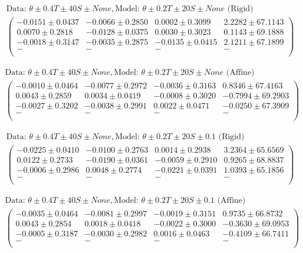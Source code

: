 \begin{align*}
\text{Data: }\theta\pm0.4 T\pm40 S\pm None, \text{Model: }\theta\pm0.2 T\pm20 S\pm None \text{ (Rigid)} \\
\begin{pmatrix}
-0.0151 \pm 0.0437 & -0.0066 \pm 0.2850 &  0.0002 \pm 0.3099 &  2.2282 \pm 67.1143 \\
 0.0070 \pm 0.2818 & -0.0128 \pm 0.0375 &  0.0030 \pm 0.3023 &  0.1143 \pm 69.1888 \\
-0.0018 \pm 0.3147 & -0.0035 \pm 0.2875 & -0.0135 \pm 0.0415 &  2.1211 \pm 67.1899 \\
 - &  - &  - & - \\
\end{pmatrix}
\end{align*}

\begin{align*}
\text{Data: }\theta\pm0.4 T\pm40 S\pm None, \text{Model: }\theta\pm0.2 T\pm20 S\pm None \text{ (Affine)} \\
\begin{pmatrix}
-0.0010 \pm 0.0464 & -0.0077 \pm 0.2972 & -0.0036 \pm 0.3163 &  0.8346 \pm 67.4163 \\
 0.0043 \pm 0.2859 &  0.0034 \pm 0.0419 & -0.0008 \pm 0.3020 & -0.7994 \pm 69.2903 \\
-0.0027 \pm 0.3202 & -0.0038 \pm 0.2991 &  0.0022 \pm 0.0471 & -0.0250 \pm 67.3909 \\
 - &  - &  - & - \\
\end{pmatrix}
\end{align*}

\begin{align*}
\text{Data: }\theta\pm0.4 T\pm40 S\pm None, \text{Model: }\theta\pm0.2 T\pm20 S\pm0.1 \text{ (Rigid)} \\
\begin{pmatrix}
-0.0225 \pm 0.0410 & -0.0100 \pm 0.2763 &  0.0014 \pm 0.2938 &  3.2364 \pm 65.6569 \\
 0.0122 \pm 0.2733 & -0.0190 \pm 0.0361 & -0.0059 \pm 0.2910 &  0.9265 \pm 68.8837 \\
-0.0006 \pm 0.2986 &  0.0048 \pm 0.2774 & -0.0221 \pm 0.0391 &  1.0393 \pm 65.1856 \\
 - &  - &  - & - \\
\end{pmatrix}
\end{align*}

\begin{align*}
\text{Data: }\theta\pm0.4 T\pm40 S\pm None, \text{Model: }\theta\pm0.2 T\pm20 S\pm0.1 \text{ (Affine)} \\
\begin{pmatrix}
-0.0035 \pm 0.0464 & -0.0081 \pm 0.2997 & -0.0019 \pm 0.3151 &  0.9735 \pm 66.8732 \\
 0.0043 \pm 0.2854 &  0.0018 \pm 0.0418 & -0.0022 \pm 0.3000 & -0.3630 \pm 69.0953 \\
-0.0005 \pm 0.3187 & -0.0030 \pm 0.2982 &  0.0016 \pm 0.0463 & -0.4109 \pm 66.7411 \\
 - &  - &  - & - \\
\end{pmatrix}
\end{align*}

